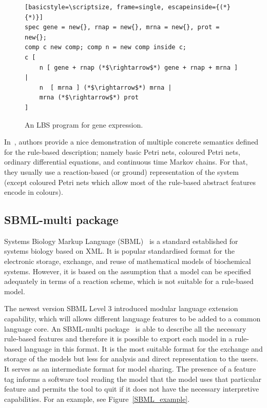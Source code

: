 \documentclass[11pt,a4paper]{report}
\begin{document}
\begin{figure}[!h]
\lstset{language=LBS}
\begin{lstlisting}[basicstyle=\scriptsize, frame=single, escapeinside={(*}{*)}]
spec gene = new{}, rnap = new{}, mrna = new{}, prot = new{}; 
comp c new comp; comp n = new comp inside c;
c [ 
	n [ gene + rnap (*$\rightarrow$*) gene + rnap + mrna ] | 
	n  [ mrna ] (*$\rightarrow$*) mrna | 
	mrna (*$\rightarrow$*) prot
]
\end{lstlisting}
\caption{An LBS program for gene expression.}\label{LBS_example}
\end{figure}

In~\cite{Pedersen}, authors provide a nice demonstration of multiple concrete semantics defined for the rule-based description; namely basic Petri nets, coloured Petri nets, ordinary differential equations, and continuous time Markov chains. For that, they usually use a reaction-based (or ground) representation of the system (except coloured Petri nets which allow most of the rule-based abstract features encode in colours).

\subsection{SBML-multi package}

Systems Biology Markup Language (SBML)~\cite{hucka2003systems} is a standard established for systems biology based on XML. It is popular standardised format for the electronic storage, exchange, and reuse of mathematical models of biochemical systems. However, it is based on the assumption that a model can be specified adequately in terms of a reaction scheme, which is not suitable for a rule-based model.

The newest version SBML Level 3 introduced modular language extension capability, which will allows different language features to be added to a common language core. An SBML-multi package~\cite{SBMLmulti} is able to describe all the necessary rule-based features and therefore it is possible to export each model in a rule-based language in this format. It is the most suitable format for the exchange and storage of the models but less for analysis and direct representation to the users. It serves as an intermediate format for model sharing. The presence of a feature tag informs a software tool reading the model that the model uses that particular feature and permits the tool to quit if it does not have the necessary interpretive capabilities. For an example, see Figure~\ref{SBML_example}.
\end{document}

